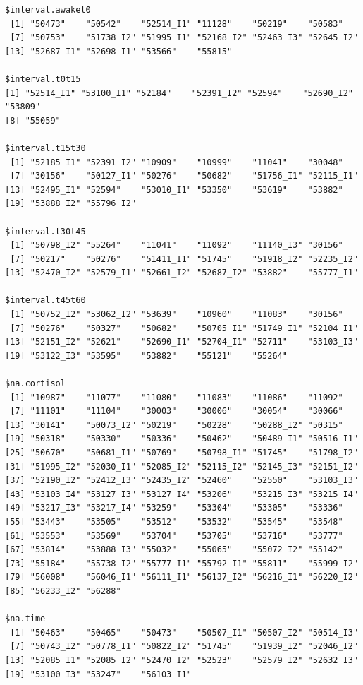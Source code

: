 \documentclass[12pt]{article}
\begin{document}
\begin{verbatim}
$interval.awaket0
 [1] "50473"    "50542"    "52514_I1" "11128"    "50219"    "50583"   
 [7] "50753"    "51738_I2" "51995_I1" "52168_I2" "52463_I3" "52645_I2"
[13] "52687_I1" "52698_I1" "53566"    "55815"   

$interval.t0t15
[1] "52514_I1" "53100_I1" "52184"    "52391_I2" "52594"    "52690_I2" "53809"   
[8] "55059"   

$interval.t15t30
 [1] "52185_I1" "52391_I2" "10909"    "10999"    "11041"    "30048"   
 [7] "30156"    "50127_I1" "50276"    "50682"    "51756_I1" "52115_I1"
[13] "52495_I1" "52594"    "53010_I1" "53350"    "53619"    "53882"   
[19] "53888_I2" "55796_I2"

$interval.t30t45
 [1] "50798_I2" "55264"    "11041"    "11092"    "11140_I3" "30156"   
 [7] "50217"    "50276"    "51411_I1" "51745"    "51918_I2" "52235_I2"
[13] "52470_I2" "52579_I1" "52661_I2" "52687_I2" "53882"    "55777_I1"

$interval.t45t60
 [1] "50752_I2" "53062_I2" "53639"    "10960"    "11083"    "30156"   
 [7] "50276"    "50327"    "50682"    "50705_I1" "51749_I1" "52104_I1"
[13] "52151_I2" "52621"    "52690_I1" "52704_I1" "52711"    "53103_I3"
[19] "53122_I3" "53595"    "53882"    "55121"    "55264"   

$na.cortisol
 [1] "10987"    "11077"    "11080"    "11083"    "11086"    "11092"   
 [7] "11101"    "11104"    "30003"    "30006"    "30054"    "30066"   
[13] "30141"    "50073_I2" "50219"    "50228"    "50288_I2" "50315"   
[19] "50318"    "50330"    "50336"    "50462"    "50489_I1" "50516_I1"
[25] "50670"    "50681_I1" "50769"    "50798_I1" "51745"    "51798_I2"
[31] "51995_I2" "52030_I1" "52085_I2" "52115_I2" "52145_I3" "52151_I2"
[37] "52190_I2" "52412_I3" "52435_I2" "52460"    "52550"    "53103_I3"
[43] "53103_I4" "53127_I3" "53127_I4" "53206"    "53215_I3" "53215_I4"
[49] "53217_I3" "53217_I4" "53259"    "53304"    "53305"    "53336"   
[55] "53443"    "53505"    "53512"    "53532"    "53545"    "53548"   
[61] "53553"    "53569"    "53704"    "53705"    "53716"    "53777"   
[67] "53814"    "53888_I3" "55032"    "55065"    "55072_I2" "55142"   
[73] "55184"    "55738_I2" "55777_I1" "55792_I1" "55811"    "55999_I2"
[79] "56008"    "56046_I1" "56111_I1" "56137_I2" "56216_I1" "56220_I2"
[85] "56233_I2" "56288"   

$na.time
 [1] "50463"    "50465"    "50473"    "50507_I1" "50507_I2" "50514_I3"
 [7] "50743_I2" "50778_I1" "50822_I2" "51745"    "51939_I2" "52046_I2"
[13] "52085_I1" "52085_I2" "52470_I2" "52523"    "52579_I2" "52632_I3"
[19] "53100_I3" "53247"    "56103_I1"
\end{verbatim}
\end{document}
